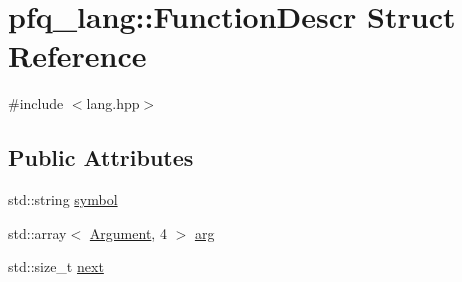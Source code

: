 \hypertarget{structpfq__lang_1_1FunctionDescr}{\section{pfq\+\_\+lang\+:\+:Function\+Descr Struct Reference}
\label{structpfq__lang_1_1FunctionDescr}
}


{\ttfamily \#include $<$lang.\+hpp$>$}

\subsection*{Public Attributes}
\begin{DoxyCompactItemize}
\item 
std\+::string \hyperlink{structpfq__lang_1_1FunctionDescr_a58a21262184201b670246fdfdf0cef92}{symbol}
\item 
std\+::array$<$ \hyperlink{structpfq__lang_1_1Argument}{Argument}, 4 $>$ \hyperlink{structpfq__lang_1_1FunctionDescr_a30060a300e3162c65b2bcaf8bde97709}{arg}
\item 
std\+::size\+\_\+t \hyperlink{structpfq__lang_1_1FunctionDescr_abe5a252468a64ff545c4a17b05650744}{next}
\end{DoxyCompactItemize}


